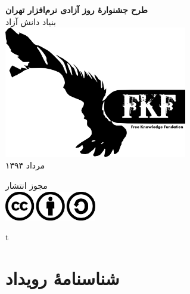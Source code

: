 \documentclass{article}
\begin{document}
\itemsep5mm \parskip2pt 

\thispagestyle{empty}

\vspace*{2cm}
\begin{center}
{\huge
\textbf{
طرح جشنوارهٔ روز آزادی نرم‌افزار تهران
}
\\[1cm]}
{\Large
بنیاد دانش آزاد
}
{\large
\\[1cm]
\baselineskip=1cm
\includegraphics[width=8cm]{images/logo.png}
\\[.4cm]
مرداد ۱۳۹۴
\\[.4cm]

}


{\large
مجوز انتشار
\\[.4cm]

\Large
\includegraphics[width=4cm]{images/cc-by-sa-license.png}

}

\end{center}


\newpage
\thispagestyle{empty}
\vspace*{\fill}
\begin{center}
\Bes
\Huge
t
\end{center}
\vspace*{\fill}


\newpage
\thispagestyle{empty}
\tableofcontents %




\newpage
\vspace*{2cm}

\section{شناسنامهٔ رویداد}
\end{document}
